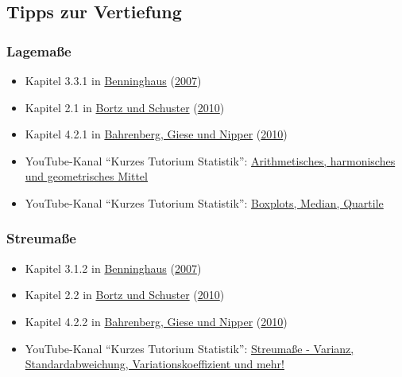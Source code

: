 \documentclass[
  ngerman,
]{article}
\providecommand{\tightlist}{%
  \setlength{\itemsep}{0pt}\setlength{\parskip}{0pt}}
\begin{document}
\hypertarget{tipps-zur-vertiefung-1}{%
\subsection{Tipps zur Vertiefung}\label{tipps-zur-vertiefung-1}}

\hypertarget{lagemauxdfe-1}{%
\subsubsection{Lagemaße}\label{lagemauxdfe-1}}

\begin{itemize}
\tightlist
\item
  Kapitel 3.3.1 in \protect\hyperlink{ref-benninghaus}{Benninghaus} (\protect\hyperlink{ref-benninghaus}{2007})
\item
  Kapitel 2.1 in \protect\hyperlink{ref-bortz}{Bortz und Schuster} (\protect\hyperlink{ref-bortz}{2010})
\item
  Kapitel 4.2.1 in \protect\hyperlink{ref-bahrenberg}{Bahrenberg, Giese und Nipper} (\protect\hyperlink{ref-bahrenberg}{2010})
\item
  YouTube-Kanal ``Kurzes Tutorium Statistik'': \href{https://www.youtube.com/watch?v=Kx9aHOMVPEg}{Arithmetisches, harmonisches und geometrisches Mittel}
\item
  YouTube-Kanal ``Kurzes Tutorium Statistik'': \href{https://www.youtube.com/watch?v=HsDeAoBOyS4}{Boxplots, Median, Quartile}
\end{itemize}

\hypertarget{streumauxdfe-1}{%
\subsubsection{Streumaße}\label{streumauxdfe-1}}

\begin{itemize}
\tightlist
\item
  Kapitel 3.1.2 in \protect\hyperlink{ref-benninghaus}{Benninghaus} (\protect\hyperlink{ref-benninghaus}{2007})
\item
  Kapitel 2.2 in \protect\hyperlink{ref-bortz}{Bortz und Schuster} (\protect\hyperlink{ref-bortz}{2010})
\item
  Kapitel 4.2.2 in \protect\hyperlink{ref-bahrenberg}{Bahrenberg, Giese und Nipper} (\protect\hyperlink{ref-bahrenberg}{2010})
\item
  YouTube-Kanal ``Kurzes Tutorium Statistik'': \href{https://www.youtube.com/watch?v=3oZrS3ZWVcA}{Streumaße - Varianz, Standardabweichung, Variationskoeffizient und mehr!}
\end{itemize}
\end{document}
